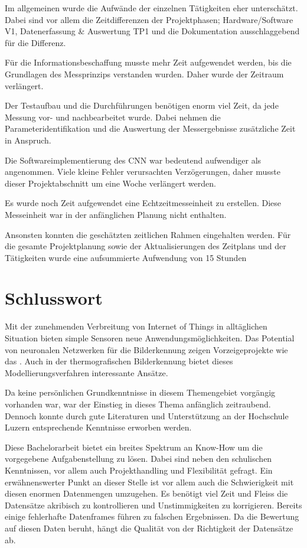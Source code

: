 Im allgemeinen wurde die Aufwände der einzelnen Tätigkeiten eher unterschätzt. Dabei sind vor allem die Zeitdifferenzen der Projektphasen; Hardware/Software V1, Datenerfassung \& Auswertung TP1 und die Dokumentation ausschlaggebend für die Differenz.

Für die Informationsbeschaffung musste mehr Zeit aufgewendet werden, bis die Grundlagen des Messprinzips verstanden wurden. Daher wurde der Zeitraum verlängert.

Der Testaufbau und die Durchführungen benötigen enorm viel Zeit, da jede Messung vor- und nachbearbeitet wurde. Dabei nehmen die Parameteridentifikation und die Auswertung der Messergebnisse zusätzliche Zeit in Anspruch. 

Die Softwareimplementierung des \ac{CNN} war bedeutend aufwendiger als angenommen. Viele kleine Fehler verursachten Verzögerungen, daher musste dieser Projektabschnitt um eine Woche verlängert werden. 

Es wurde noch Zeit aufgewendet eine Echtzeitmesseinheit zu erstellen. Diese Messeinheit war in der anfänglichen Planung nicht enthalten. 

Ansonsten konnten die geschätzten zeitlichen Rahmen eingehalten werden. Für die gesamte Projektplanung sowie der Aktualisierungen des Zeitplans und der Tätigkeiten wurde eine aufsummierte Aufwendung von 15 Stunden 



\newpage
\section{Schlusswort}
\label{sec:Schlusswort}
Mit der zunehmenden Verbreitung von Internet of Things in alltäglichen Situation bieten simple Sensoren neue Anwendungsmöglichkeiten. Das Potential von neuronalen Netzwerken für die Bilderkennung zeigen Vorzeigeprojekte wie das . Auch in der thermografischen Bilderkennung bietet dieses Modellierungsverfahren interessante Ansätze.

Da keine persönlichen Grundkenntnisse in diesem Themengebiet vorgängig vorhanden war, war der Einstieg in dieses Thema anfänglich zeitraubend. Dennoch konnte durch gute Literaturen und Unterstützung an der Hochschule Luzern entsprechende Kenntnisse erworben werden. 

Diese Bachelorarbeit bietet ein breites Spektrum an Know-How um die vorgegebene Aufgabenstellung zu lösen. Dabei sind neben den schulischen Kenntnissen, vor allem auch Projekthandling und Flexibilität gefragt. Ein erwähnenswerter Punkt an dieser Stelle ist vor allem auch die Schwierigkeit mit diesen enormen Datenmengen umzugehen. Es benötigt viel Zeit und Fleiss die Datensätze akribisch zu kontrollieren und Unstimmigkeiten zu korrigieren. Bereits einige fehlerhafte Datenframes führen zu  falschen Ergebnissen. Da die Bewertung auf diesen Daten beruht, hängt die Qualität von der Richtigkeit der Datensätze ab.

